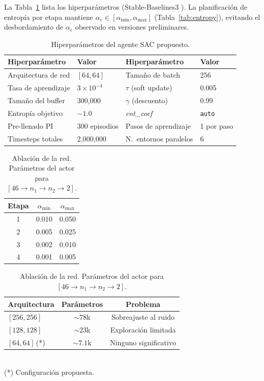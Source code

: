 \documentclass[processes,article,submit,moreauthors,pdftex]{Definitions/mdpi}
\begin{document}
La Tabla~\ref{tab:hyperparams} lista los hiperparámetros (Stable-Baselines3
\cite{Raffin2021}). La planificación de entropía por etapa mantiene
$\alpha_e \in [\alpha_{\min}, \alpha_{\max}]$ (Tabla~\ref{tab:entropy}),
evitando el desbordamiento de $\alpha_e$ observado en versiones preliminares.

\begin{table}[H]
\caption{Hiperparámetros del agente SAC propuesto.}
\label{tab:hyperparams}
\begin{tabular}{llll}
\toprule
\textbf{Hiperparámetro} & \textbf{Valor} & \textbf{Hiperparámetro} & \textbf{Valor} \\
\midrule
Arquitectura de red & $[64, 64]$       & Tamaño de batch       & 256 \\
Tasa de aprendizaje & $3\times10^{-4}$ & $\tau$ (soft update)  & 0.005 \\
Tamaño del buffer   & 300{,}000        & $\gamma$ (descuento)  & 0.99 \\
Entropía objetivo   & $-1.0$           & \textit{ent\_coef}    & \texttt{auto} \\
Pre-llenado PI      & 300 episodios    & Pasos de aprendizaje  & 1 por paso \\
Timesteps totales   & 2{,}000{,}000    & N.\ entornos paralelos & 6 \\
\bottomrule
\end{tabular}
\end{table}

\begin{table}[H]
\begin{minipage}[t]{0.46\textwidth}
\caption{Planificación de la temperatura de entropía $\alpha_e$ por etapa.}
\label{tab:entropy}
\centering
\begin{tabular}{ccc}
\toprule
\textbf{Etapa} & $\alpha_{\min}$ & $\alpha_{\max}$ \\
\midrule
1 & 0.010 & 0.050 \\
2 & 0.005 & 0.025 \\
3 & 0.002 & 0.010 \\
4 & 0.001 & 0.005 \\
\bottomrule
\end{tabular}
\end{minipage}\hfill
\begin{minipage}[t]{0.50\textwidth}
\caption{Ablación de la red. Parámetros del actor para $[46\to n_1\to n_2\to 2]$.}
\label{tab:ablation}
\centering
\begin{tabular}{lcc}
\toprule
\textbf{Arquitectura} & \textbf{Parámetros} & \textbf{Problema} \\
\midrule
$[256,256]$ & $\sim\!78$k & Sobreajuste al ruido \\
$[128,128]$ & $\sim\!23$k & Exploración limitada \\
$[64,64]$\,(*) & $\sim\!7.1$k & Ninguno significativo \\
\bottomrule
\end{tabular}
\\[2pt]\footnotesize (*) Configuración propuesta.
\end{minipage}
\end{table}
\end{document}
